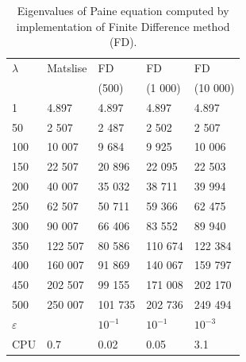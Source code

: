 \documentclass[11pt,a4paper,oneside,openright]{report} %
\begin{document}
\begin{table}[H]
\centering
\caption{Eigenvalues of Paine equation computed by implementation of Finite Difference method (FD).}
\label{}
{\small
\begin{tabularx}{\textwidth}{l *{4}{X}}
\toprule
$\lambda$ & Matslise & FD  & FD  & FD  \\
 &  & (500) & (1 000) & (10 000) \\
\midrule
1   & 4.897   & 4.897   & 4.897   & 4.897   \\
50  & 2 507   & 2 487   & 2 502   & 2 507   \\
100 & 10 007  & 9 684   & 9 925   & 10 006  \\
150 & 22 507  & 20 896  & 22 095  & 22 503  \\
200 & 40 007  & 35 032  & 38 711  & 39 994  \\
250 & 62 507  & 50 711  & 59 366  & 62 475  \\
300 & 90 007  & 66 406  & 83 552  & 89 940  \\
350 & 122 507 & 80 586  & 110 674 & 122 384 \\
400 & 160 007 & 91 869  & 140 067 & 159 797 \\
450 & 202 507 & 99 155  & 171 008 & 202 170 \\
500 & 250 007 & 101 735 & 202 736 & 249 494 \\
\midrule
$\varepsilon$ & & $10^{-1}$ & $10^{-1}$ & $10^{-3}$ \\
CPU & 0.7 & 0.02 & 0.05 & 3.1 \\
\bottomrule
\end{tabularx}
}
\end{table}
\end{document}
